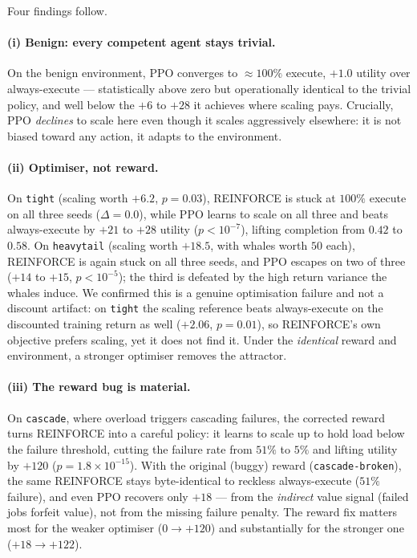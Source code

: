 \documentclass[10pt,twocolumn]{article}
\newcommand{\env}[1]{\texttt{#1}}
\begin{document}
Four findings follow.

\paragraph{(i) Benign: every competent agent stays trivial.} On the benign
environment, PPO converges to $\approx\!100\%$ execute, $+1.0$ utility over
always-execute --- statistically above zero but operationally identical to the
trivial policy, and well below the $+6$ to $+28$ it achieves where scaling pays.
Crucially, PPO \emph{declines} to scale here even though it scales aggressively
elsewhere: it is not biased toward any action, it adapts to the environment.

\paragraph{(ii) Optimiser, not reward.} On \env{tight} (scaling worth $+6.2$,
$p=0.03$), REINFORCE is stuck at $100\%$ execute on all three seeds ($\Delta=0.0$),
while PPO learns to scale on all three and beats always-execute by $+21$ to $+28$
utility ($p<10^{-7}$), lifting completion from $0.42$ to $0.58$. On
\env{heavytail} (scaling worth $+18.5$, with whales worth $50$ each), REINFORCE is
again stuck on all three seeds, and PPO escapes on two of three ($+14$ to $+15$,
$p<10^{-5}$); the third is defeated by the high return variance the whales induce.
We confirmed this is a genuine optimisation failure and not a discount artifact:
on \env{tight} the scaling reference beats always-execute on the discounted
training return as well ($+2.06$, $p=0.01$), so REINFORCE's own objective prefers
scaling, yet it does not find it. Under the \emph{identical} reward and
environment, a stronger optimiser removes the attractor.

\paragraph{(iii) The reward bug is material.} On \env{cascade}, where overload
triggers cascading failures, the corrected reward turns REINFORCE into a careful
policy: it learns to scale up to hold load below the failure threshold, cutting
the failure rate from $51\%$ to $5\%$ and lifting utility by $+120$
($p=1.8\times10^{-15}$). With the original (buggy) reward
(\env{cascade-broken}), the same REINFORCE stays byte-identical to reckless
always-execute ($51\%$ failure), and even PPO recovers only $+18$ --- from the
\emph{indirect} value signal (failed jobs forfeit value), not from the missing
failure penalty. The reward fix matters most for the weaker optimiser ($0\to+120$)
and substantially for the stronger one ($+18\to+122$).
\end{document}
